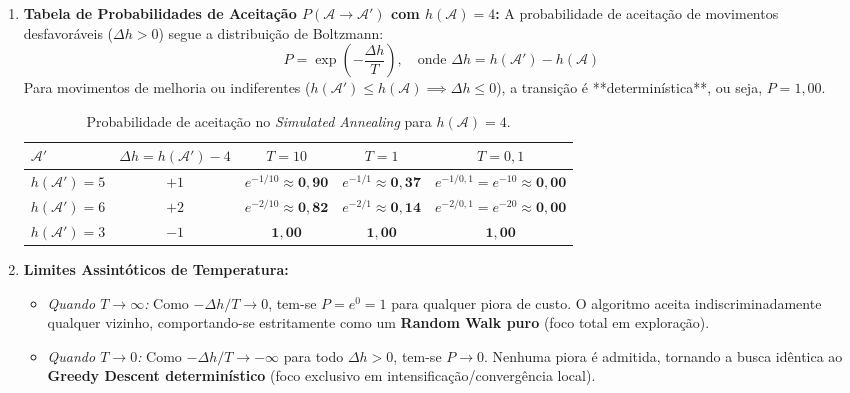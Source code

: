 \begin{enumerate}[label=(\alph*)]
    \item \textbf{Tabela de Probabilidades de Aceitação $P(\mathcal{A} \to \mathcal{A}')$ com $h(\mathcal{A}) = 4$:}
    A probabilidade de aceitação de movimentos desfavoráveis ($\Delta h > 0$) segue a distribuição de Boltzmann:
    \begin{equation*}
        P = \exp\left(-\frac{\Delta h}{T}\right), \quad \text{onde } \Delta h = h(\mathcal{A}') - h(\mathcal{A})
    \end{equation*}
    Para movimentos de melhoria ou indiferentes ($h(\mathcal{A}') \le h(\mathcal{A}) \implies \Delta h \le 0$), a transição é **determinística**, ou seja, $P = 1{,}00$.

    \begin{table}[H]
    \centering
    \caption{Probabilidade de aceitação no \textit{Simulated Annealing} para $h(\mathcal{A}) = 4$.}
    \label{tab:sa_prob}
    \begin{tabular}{@{}lcccc@{}}
    \toprule
    $\mathcal{A}'$ & $\Delta h = h(\mathcal{A}') - 4$ & $T = 10$ & $T = 1$ & $T = 0{,}1$ \\ \midrule
    $h(\mathcal{A}') = 5$ & $+1$ & $e^{-1/10} \approx \mathbf{0{,}90}$ & $e^{-1/1} \approx \mathbf{0{,}37}$ & $e^{-1/0{,}1} = e^{-10} \approx \mathbf{0{,}00}$ \\
    $h(\mathcal{A}') = 6$ & $+2$ & $e^{-2/10} \approx \mathbf{0{,}82}$ & $e^{-2/1} \approx \mathbf{0{,}14}$ & $e^{-2/0{,}1} = e^{-20} \approx \mathbf{0{,}00}$ \\
    $h(\mathcal{A}') = 3$ & $-1$ & $\mathbf{1{,}00}$ & $\mathbf{1{,}00}$ & $\mathbf{1{,}00}$ \\ \bottomrule
    \end{tabular}
    \end{table}

    \item \textbf{Limites Assintóticos de Temperatura:}
    \begin{itemize}
        \item \textit{Quando $T \to \infty$:} Como $-\Delta h / T \to 0$, tem-se $P = e^0 = 1$ para qualquer piora de custo. O algoritmo aceita indiscriminadamente qualquer vizinho, comportando-se estritamente como um \textbf{Random Walk puro} (foco total em exploração).
        \item \textit{Quando $T \to 0$:} Como $-\Delta h / T \to -\infty$ para todo $\Delta h > 0$, tem-se $P \to 0$. Nenhuma piora é admitida, tornando a busca idêntica ao \textbf{Greedy Descent determinístico} (foco exclusivo em intensificação/convergência local).
    \end{itemize}


\end{enumerate}
